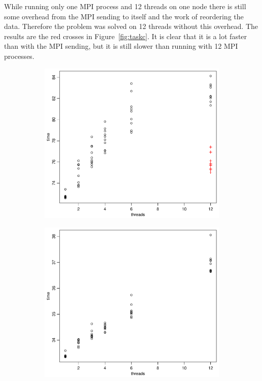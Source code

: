 While running only one MPI process and 12 threads on one node there is still some overhead from the MPI sending to itself and the work of reordering the data. Therefore the problem was solved on 12 threads without this overhead. The results are the red crosses in Figure~\ref{fig:taskc}. It is clear that it is a lot faster than with the MPI sending, but it is still slower than running with 12 MPI processes. 
\begin{figure}[h!]
  \centering
  \begin{subfigure}[b]{0.48\textwidth}
    \includegraphics[width=\textwidth]{./Figures/taskc1.pdf}
  \end{subfigure}%
  \quad
  \begin{subfigure}[b]{0.48\textwidth}
    \includegraphics[width=\textwidth]{./Figures/taskc2.pdf}

\end{subfigure}
\end{figure}
